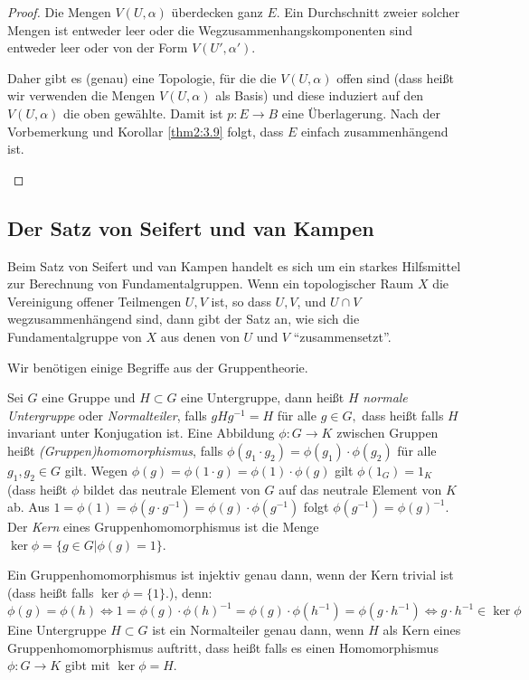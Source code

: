 \documentclass[a4paper,10pt]{scrartcl}
\begin{document}
\begin{proof}
Die Mengen $V(U, \alpha)$ überdecken ganz $E$. Ein Durchschnitt zweier solcher Mengen ist entweder leer oder die Wegzusammenhangskomponenten sind entweder leer oder von der Form $V(U', \alpha')$.

Daher gibt es (genau) eine Topologie, für die die $V(U, \alpha)$ offen sind (dass heißt wir verwenden die Mengen $V(U, \alpha)$ als Basis) und diese induziert auf den $V(U, \alpha)$ die oben gewählte. Damit ist $p:E \to B$ eine Überlagerung. Nach der Vorbemerkung und Korollar \ref{thm2:3.9} folgt, dass $E$ einfach zusammenhängend ist.
\begin{figure}[H]
\centering
 \fixme[fig104]
\caption{}
\end{figure} 
\end{proof}

\subsection{Der Satz von Seifert und van Kampen}
Beim Satz von Seifert und van Kampen handelt es sich um ein starkes Hilfsmittel zur Berechnung von Fundamentalgruppen. Wenn ein topologischer Raum $X$ die Vereinigung offener Teilmengen $U,V$ ist, so dass $U,V$, und $U\cap V$ wegzusammenhängend sind, dann gibt der Satz an, wie sich die Fundamentalgruppe von $X$ aus denen von $U$ und $V$ "`zusammensetzt"'.
\begin{figure}[H]
 \centering
 \fixme[fig105]
\caption{}
\end{figure}
Wir benötigen einige Begriffe aus der Gruppentheorie.

Sei $G$ eine Gruppe und $H\subset G$ eine Untergruppe, dann heißt $H$ \emph{normale Untergruppe} oder \emph{Normalteiler}, falls $gHg^{-1}=H$ für alle $g\in G,$ dass heißt falls $H$ invariant unter Konjugation ist. Eine Abbildung $\phi: G\to K$ zwischen Gruppen heißt \emph{(Gruppen)homomorphismus}, falls $\phi(g_1\cdot g_2)=\phi(g_1)\cdot \phi(g_2)$ für alle $g_1, g_2\in G$ gilt. Wegen $\phi(g)=\phi(1\cdot g)=\phi(1)\cdot \phi(g)$ gilt $\phi(1_G)=1_K$ (dass heißt $\phi$ bildet das neutrale Element von $G$ auf das neutrale Element von $K$ ab. Aus $1=\phi(1)=\phi(g\cdot g^{-1})=\phi(g)\cdot \phi(g^{-1})$ folgt $\phi(g^{-1})=\phi(g)^{-1}$.  Der \emph{Kern} eines Gruppenhomomorphismus ist die Menge $\ker \phi = \{g\in G|\phi(g)=1\}$.

Ein Gruppenhomomorphismus ist injektiv genau dann, wenn der Kern trivial ist (dass heißt falls $\ker \phi = \{1\}$.), denn:
\[
 \phi(g)=\phi(h)\iff 1=\phi(g)\cdot \phi(h)^{-1}=\phi(g)\cdot \phi(h^{-1})=\phi(g\cdot h^{-1})\iff g\cdot h^{-1}\in \ker \phi
\]
Eine Untergruppe $H\subset G$ ist ein Normalteiler genau dann, wenn $H$ als Kern eines Gruppenhomomorphismus auftritt, dass heißt falls es einen Homomorphismus $\phi: G\to K$ gibt mit $\ker \phi=H$.
\end{document}
